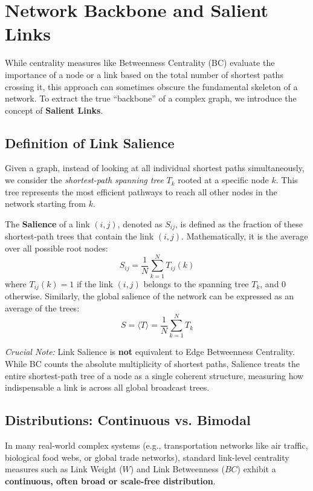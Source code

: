 \section{Network Backbone and Salient Links}

While centrality measures like Betweenness Centrality (BC) evaluate the importance of a node or a link based on the total number of shortest paths crossing it, this approach can sometimes obscure the fundamental skeleton of a network. To extract the true ``backbone'' of a complex graph, we introduce the concept of \textbf{Salient Links}.

\subsection{Definition of Link Salience}
Given a graph, instead of looking at all individual shortest paths simultaneously, we consider the \textit{shortest-path spanning tree} $T_k$ rooted at a specific node $k$. This tree represents the most efficient pathways to reach all other nodes in the network starting from $k$.

The \textbf{Salience} of a link $(i,j)$, denoted as $S_{ij}$, is defined as the fraction of these shortest-path trees that contain the link $(i,j)$. Mathematically, it is the average over all possible root nodes:
\[ S_{ij} = \frac{1}{N} \sum_{k=1}^{N} T_{ij}(k) \]
where $T_{ij}(k) = 1$ if the link $(i,j)$ belongs to the spanning tree $T_k$, and $0$ otherwise.
Similarly, the global salience of the network can be expressed as an average of the trees:
\[ S = \langle T \rangle = \frac{1}{N} \sum_{k=1}^{N} T_k \]

\textit{Crucial Note:} Link Salience is \textbf{not} equivalent to Edge Betweenness Centrality. While BC counts the absolute multiplicity of shortest paths, Salience treats the entire shortest-path tree of a node as a single coherent structure, measuring how indispensable a link is across all global broadcast trees.

\subsection{Distributions: Continuous vs. Bimodal}

In many real-world complex systems (e.g., transportation networks like air traffic, biological food webs, or global trade networks), standard link-level centrality measures such as Link Weight ($W$) and Link Betweenness ($BC$) exhibit a \textbf{continuous, often broad or scale-free distribution}.

